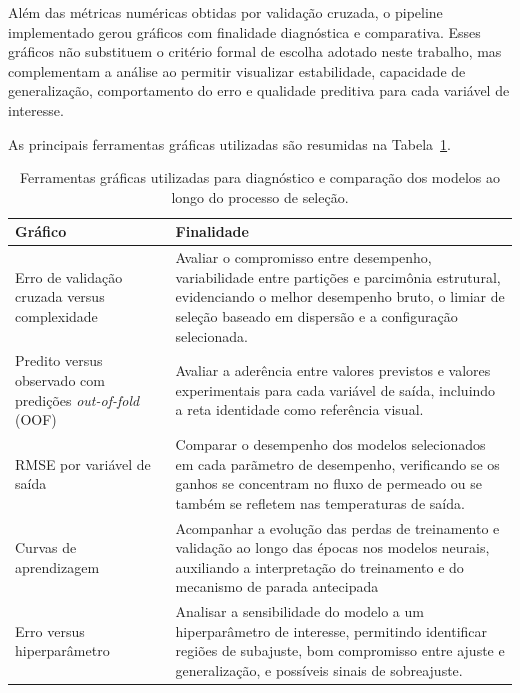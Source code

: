 Além das métricas numéricas obtidas por validação cruzada, o pipeline implementado gerou gráficos com finalidade diagnóstica e comparativa. Esses gráficos não substituem o critério formal de escolha adotado neste trabalho, mas complementam a análise ao permitir visualizar estabilidade, capacidade de generalização, comportamento do erro e qualidade preditiva para cada variável de interesse.

As principais ferramentas gráficas utilizadas são resumidas na Tabela~\ref{tab:graficos_diagnostico}.

\begin{table}[H]
\centering
\caption[Ferramentas gráficas utilizadas para diagnóstico dos modelos]{Ferramentas gráficas utilizadas para diagnóstico e comparação dos modelos ao longo do processo de seleção.}
\label{tab:graficos_diagnostico}
\begin{tabular}{p{4.3cm} p{9.5cm}}
\hline
\textbf{Gráfico} & \textbf{Finalidade} \\
\hline

Erro de validação cruzada versus complexidade
&
Avaliar o compromisso entre desempenho, variabilidade entre partições e parcimônia estrutural, evidenciando o melhor desempenho bruto, o limiar de seleção baseado em dispersão e a configuração selecionada. \\

Predito versus observado com predições \textit{out-of-fold} (OOF)
&
Avaliar a aderência entre valores previstos e valores experimentais para cada variável de saída, incluindo a reta identidade como referência visual. \\

RMSE por variável de saída
&
Comparar o desempenho dos modelos selecionados em cada parãmetro de desempenho, verificando se os ganhos se concentram no fluxo de permeado ou se também se refletem nas temperaturas de saída. \\

Curvas de aprendizagem
&
Acompanhar a evolução das perdas de treinamento e validação ao longo das épocas nos modelos neurais, auxiliando a interpretação do treinamento e do mecanismo de parada antecipada \\

Erro versus hiperparâmetro
&
Analisar a sensibilidade do modelo a um hiperparâmetro de interesse, permitindo identificar regiões de subajuste, bom compromisso entre ajuste e generalização, e possíveis sinais de sobreajuste. \\

\hline
\end{tabular}
\end{table}

